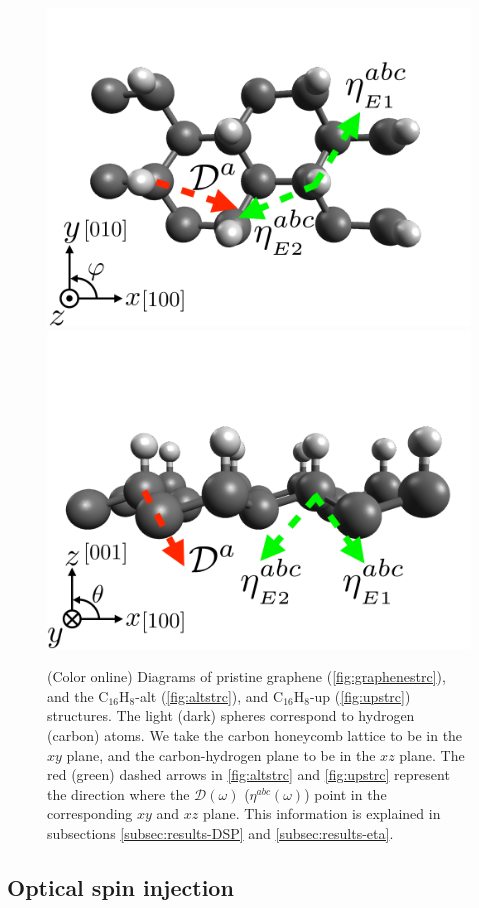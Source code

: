\documentclass[pss]{wiley2sp} %
\begin{document}
\begin{figure}[t]
{\includegraphics[width=0.49\linewidth]{figures/images/up1}
\includegraphics[width=0.49\linewidth]{figures/images/up2}
\label{fig:upstrc}}
\caption{(Color online) Diagrams of pristine graphene
(\ref{fig:graphenestrc}), and the C$_{16}$H$_{8}$-alt (\ref{fig:altstrc}), and
C$_{16}$H$_{8}$-up (\ref{fig:upstrc}) structures. The light (dark) spheres
correspond to hydrogen (carbon) atoms. We take the carbon honeycomb lattice to
be in the $xy$ plane, and the carbon-hydrogen plane to be in the $xz$ plane.
The red (green) dashed arrows in \ref{fig:altstrc} and \ref{fig:upstrc}
represent the direction where the $\mathcal{D}(\omega)$ ($\eta^{abc}(\omega)$)
point in the corresponding $xy$ and $xz$ plane. This information is explained
in subsections \ref{subsec:results-DSP} and \ref{subsec:results-eta}.
\label{fig:structures}}
\end{figure}


\subsection{Optical spin injection}
\end{document}
